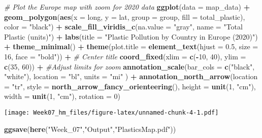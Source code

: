 \documentclass[
]{article}
\newenvironment{Shaded}{\begin{snugshade}}{\end{snugshade}}
\newcommand{\AttributeTok}[1]{\textcolor[rgb]{0.13,0.29,0.53}{#1}}
\newcommand{\CommentTok}[1]{\textcolor[rgb]{0.56,0.35,0.01}{\textit{#1}}}
\newcommand{\DecValTok}[1]{\textcolor[rgb]{0.00,0.00,0.81}{#1}}
\newcommand{\FloatTok}[1]{\textcolor[rgb]{0.00,0.00,0.81}{#1}}
\newcommand{\FunctionTok}[1]{\textcolor[rgb]{0.13,0.29,0.53}{\textbf{#1}}}
\newcommand{\NormalTok}[1]{#1}
\newcommand{\SpecialCharTok}[1]{\textcolor[rgb]{0.81,0.36,0.00}{\textbf{#1}}}
\newcommand{\StringTok}[1]{\textcolor[rgb]{0.31,0.60,0.02}{#1}}
\begin{document}
\begin{Shaded}
\begin{Highlighting}[]
\CommentTok{\# Plot the Europe map with zoom for 2020 data}
\FunctionTok{ggplot}\NormalTok{(}\AttributeTok{data =}\NormalTok{ map\_data) }\SpecialCharTok{+}
  \FunctionTok{geom\_polygon}\NormalTok{(}\FunctionTok{aes}\NormalTok{(}\AttributeTok{x =}\NormalTok{ long, }\AttributeTok{y =}\NormalTok{ lat, }\AttributeTok{group =}\NormalTok{ group, }\AttributeTok{fill =}\NormalTok{ total\_plastic), }\AttributeTok{color =} \StringTok{"black"}\NormalTok{) }\SpecialCharTok{+}
  \FunctionTok{scale\_fill\_viridis\_c}\NormalTok{(}\AttributeTok{na.value =} \StringTok{"gray"}\NormalTok{, }\AttributeTok{name =} \StringTok{"Total Plastic (units)"}\NormalTok{) }\SpecialCharTok{+}
  \FunctionTok{labs}\NormalTok{(}\AttributeTok{title =} \StringTok{"Plastic Pollution by Country in Europe (2020)"}\NormalTok{) }\SpecialCharTok{+}
  \FunctionTok{theme\_minimal}\NormalTok{() }\SpecialCharTok{+}
    \FunctionTok{theme}\NormalTok{(}\AttributeTok{plot.title =} \FunctionTok{element\_text}\NormalTok{(}\AttributeTok{hjust =} \FloatTok{0.5}\NormalTok{, }\AttributeTok{size =} \DecValTok{16}\NormalTok{, }\AttributeTok{face =} \StringTok{"bold"}\NormalTok{)) }\SpecialCharTok{+}  \CommentTok{\# Center title}
  \FunctionTok{coord\_fixed}\NormalTok{(}\AttributeTok{xlim =} \FunctionTok{c}\NormalTok{(}\SpecialCharTok{{-}}\DecValTok{10}\NormalTok{, }\DecValTok{40}\NormalTok{), }\AttributeTok{ylim =} \FunctionTok{c}\NormalTok{(}\DecValTok{35}\NormalTok{, }\DecValTok{60}\NormalTok{)) }\SpecialCharTok{+} \CommentTok{\#Adjust limits for zoom}
  \FunctionTok{annotation\_scale}\NormalTok{(}\AttributeTok{bar\_cols =} \FunctionTok{c}\NormalTok{(}\StringTok{"black"}\NormalTok{, }\StringTok{"white"}\NormalTok{), }\AttributeTok{location =} \StringTok{"bl"}\NormalTok{, }\AttributeTok{units =} \StringTok{"mi"}\NormalTok{ ) }\SpecialCharTok{+}
  \FunctionTok{annotation\_north\_arrow}\NormalTok{(}\AttributeTok{location =} \StringTok{"tr"}\NormalTok{,}
                       \AttributeTok{style =} \FunctionTok{north\_arrow\_fancy\_orienteering}\NormalTok{(),}
                       \AttributeTok{height =} \FunctionTok{unit}\NormalTok{(}\DecValTok{1}\NormalTok{, }\StringTok{"cm"}\NormalTok{),}
                       \AttributeTok{width =} \FunctionTok{unit}\NormalTok{(}\DecValTok{1}\NormalTok{, }\StringTok{"cm"}\NormalTok{),}
                       \AttributeTok{rotation =} \DecValTok{0}\NormalTok{)  }
\end{Highlighting}
\end{Shaded}

\texttt{[image: Week07\_hm\_files/figure-latex/unnamed-chunk-4-1.pdf]}

\begin{Shaded}
\begin{Highlighting}[]
\FunctionTok{ggsave}\NormalTok{(}\FunctionTok{here}\NormalTok{(}\StringTok{"Week\_07"}\NormalTok{,}\StringTok{"Output"}\NormalTok{,}\StringTok{"PlasticsMap.pdf"}\NormalTok{))}
\end{Highlighting}
\end{Shaded}
\end{document}
